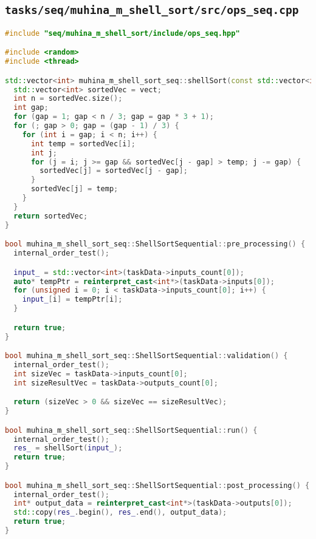 \documentclass[12pt]{article}
\begin{document}
\subsection*{\texttt{tasks/seq/muhina\_m\_shell\_sort/src/ops\_seq.cpp}}

\begin{lstlisting}[language=C++]
#include "seq/muhina_m_shell_sort/include/ops_seq.hpp"

#include <random>
#include <thread>

std::vector<int> muhina_m_shell_sort_seq::shellSort(const std::vector<int>& vect) {
  std::vector<int> sortedVec = vect;
  int n = sortedVec.size();
  int gap;
  for (gap = 1; gap < n / 3; gap = gap * 3 + 1);
  for (; gap > 0; gap = (gap - 1) / 3) {
    for (int i = gap; i < n; i++) {
      int temp = sortedVec[i];
      int j;
      for (j = i; j >= gap && sortedVec[j - gap] > temp; j -= gap) {
        sortedVec[j] = sortedVec[j - gap];
      }
      sortedVec[j] = temp;
    }
  }
  return sortedVec;
}

bool muhina_m_shell_sort_seq::ShellSortSequential::pre_processing() {
  internal_order_test();

  input_ = std::vector<int>(taskData->inputs_count[0]);
  auto* tempPtr = reinterpret_cast<int*>(taskData->inputs[0]);
  for (unsigned i = 0; i < taskData->inputs_count[0]; i++) {
    input_[i] = tempPtr[i];
  }

  return true;
}

bool muhina_m_shell_sort_seq::ShellSortSequential::validation() {
  internal_order_test();
  int sizeVec = taskData->inputs_count[0];
  int sizeResultVec = taskData->outputs_count[0];

  return (sizeVec > 0 && sizeVec == sizeResultVec);
}

bool muhina_m_shell_sort_seq::ShellSortSequential::run() {
  internal_order_test();
  res_ = shellSort(input_);
  return true;
}

bool muhina_m_shell_sort_seq::ShellSortSequential::post_processing() {
  internal_order_test();
  int* output_data = reinterpret_cast<int*>(taskData->outputs[0]);
  std::copy(res_.begin(), res_.end(), output_data);
  return true;
}

\end{lstlisting}
\end{document}
